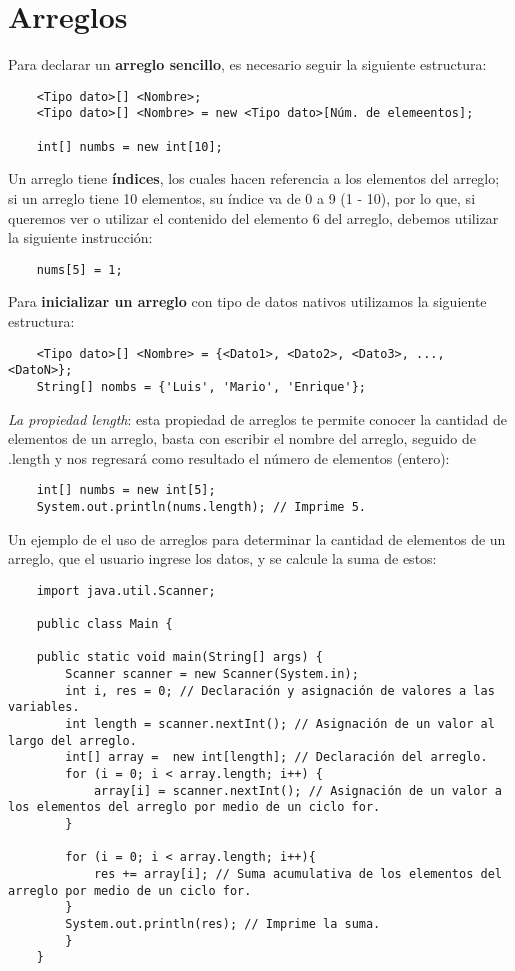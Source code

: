 \section{Arreglos}

Para declarar un \textbf{arreglo sencillo}, es necesario seguir la siguiente estructura:
\begin{lstlisting}
    <Tipo dato>[] <Nombre>;
    <Tipo dato>[] <Nombre> = new <Tipo dato>[Núm. de elemeentos];

    int[] numbs = new int[10];
\end{lstlisting}

Un arreglo tiene \textbf{índices}, los cuales hacen referencia a los elementos del arreglo; si un arreglo tiene 10 elementos, su índice va de 0 a 9 (1 - 10), por lo que, si queremos ver o utilizar el contenido del elemento 6 del arreglo, debemos utilizar la siguiente instrucción:
\begin{lstlisting}
    nums[5] = 1;
\end{lstlisting}

Para \textbf{inicializar un arreglo} con tipo de datos nativos utilizamos la siguiente estructura:
\begin{lstlisting}
    <Tipo dato>[] <Nombre> = {<Dato1>, <Dato2>, <Dato3>, ..., <DatoN>};
    String[] nombs = {'Luis', 'Mario', 'Enrique'};
\end{lstlisting}

\textit{La propiedad \textit{length}}: esta propiedad de arreglos te permite conocer la cantidad de elementos de un arreglo, basta con escribir el nombre del arreglo, seguido de .length y nos regresará como resultado el número de elementos (entero):
\begin{lstlisting}
    int[] numbs = new int[5];
    System.out.println(nums.length); // Imprime 5.
\end{lstlisting}

Un ejemplo de el uso de arreglos para determinar la cantidad de elementos de un arreglo, que el usuario ingrese los datos, y se calcule la suma de estos:
\begin{lstlisting}
    import java.util.Scanner;

    public class Main {

    public static void main(String[] args) {
        Scanner scanner = new Scanner(System.in);
        int i, res = 0; // Declaración y asignación de valores a las variables.
        int length = scanner.nextInt(); // Asignación de un valor al largo del arreglo.
        int[] array =  new int[length]; // Declaración del arreglo.
        for (i = 0; i < array.length; i++) {
            array[i] = scanner.nextInt(); // Asignación de un valor a los elementos del arreglo por medio de un ciclo for.
        }

        for (i = 0; i < array.length; i++){
            res += array[i]; // Suma acumulativa de los elementos del arreglo por medio de un ciclo for.
        }
        System.out.println(res); // Imprime la suma.
        }
    }
\end{lstlisting}


